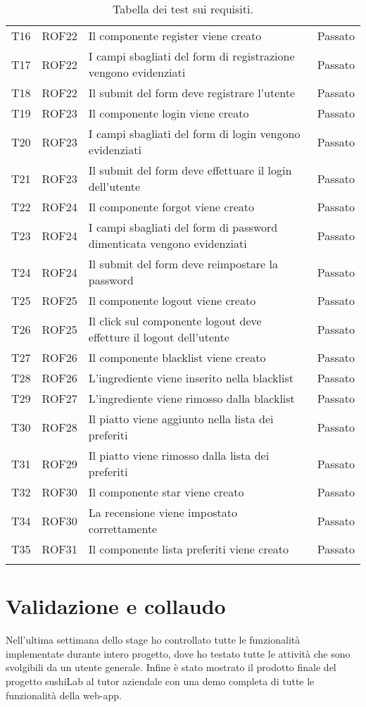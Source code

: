 \begin{center}
\begin{longtable}{ |p{1cm}|p{1.5cm}|p{9cm}|p{1.5cm}|  }
        T16&ROF22&Il componente register viene creato&Passato\\
        T17&ROF22&I campi sbagliati del form di registrazione vengono evidenziati&Passato\\
        T18&ROF22&Il submit del form deve registrare l'utente&Passato\\
        T19&ROF23&Il componente login viene creato&Passato\\
        T20&ROF23&I campi sbagliati del form di login vengono evidenziati &Passato\\
        T21&ROF23&Il submit del form deve effettuare il login dell'utente &Passato\\
        T22&ROF24&Il componente forgot viene creato  &Passato\\
        T23&ROF24&I campi sbagliati del form di password dimenticata vengono evidenziati &Passato\\
        T24&ROF24&Il submit del form deve reimpostare la password&Passato\\
        T25&ROF25&Il componente logout viene creato&Passato\\
        T26&ROF25&Il click sul componente logout deve effetture il logout dell'utente&Passato\\
        T27&ROF26&Il componente blacklist viene creato&Passato\\
        T28&ROF26&L'ingrediente viene inserito nella blacklist&Passato\\
        T29&ROF27&L'ingrediente viene rimosso dalla blacklist&Passato\\
        T30&ROF28&Il piatto viene aggiunto nella lista dei preferiti&Passato\\
        T31&ROF29&Il piatto viene rimosso dalla lista dei preferiti&Passato\\
        T32&ROF30&Il componente star viene creato&Passato\\
        T34&ROF30&La recensione viene impostato correttamente&Passato\\
        T35&ROF31&Il componente lista preferiti viene creato&Passato\\
\hline
\caption{\label{tab:tabella dei test sui requisiti}Tabella dei test sui requisiti.}
\end{longtable}
\end{center}
\section{Validazione e collaudo}
Nell'ultima settimana dello stage ho controllato tutte le funzionalità implementate durante intero progetto, dove ho testato tutte le attività che sono svolgibili da un utente generale. Infine è stato mostrato il prodotto finale del progetto sushiLab al tutor aziendale con una demo completa di tutte le funzionalità della web-app.